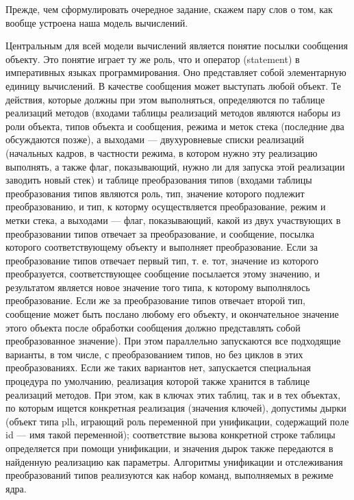 \documentclass{report}
\begin{document}
    Прежде, чем сформулировать очередное задание, скажем пару слов о том, как вообще устроена наша модель вычислений.

    Центральным для всей модели вычислений является понятие посылки сообщения объекту. Это понятие играет ту же роль, что и оператор (statement) в императивных языках программирования. Оно представляет собой элементарную единицу вычислений. В качестве сообщения может выступать любой объект. Те действия, которые должны при этом выполняться, определяются по таблице реализаций методов (входами таблицы реализаций методов являются наборы из роли объекта, типов объекта и сообщения, режима и меток стека (последние два обсуждаются позже), а выходами --- двухуровневые списки реализаций (начальных кадров, в частности режима, в котором нужно эту реализацию выполнять, а также флаг, показывающий, нужно ли для запуска этой реализации заводить новый стек) и таблице преобразования типов (входами таблицы преобразования типов являются роль, тип, значение которого подлежит преобразованию, и тип, к которму осуществляется преобразование, режим и метки стека, а выходами --- флаг, показывающий, какой из двух участвующих в преобразовании типов отвечает за преобразование, и сообщение, посылка которого соответствующему объекту и выполняет преобразование. Если за преобразование типов отвечает первый тип, т. е. тот, значение из которого преобразуется, соответствующее сообщение посылается этому значению, и результатом является новое значение того типа, к которому выполнялось преобразование. Если же за преобразование типов отвечает второй тип, сообщение может быть послано любому его объекту, и окончательное значение этого объекта после обработки сообщения должно представлять собой преобразованное значение). При этом параллельно запускаются все подходящие варианты, в том числе, с преобразованием типов, но без циклов в этих преобразованиях. Если же таких вариантов нет, запускается специальная процедура по умолчанию, реализация которой также хранится в таблице реализаций методов. При этом, как в ключах этих таблиц, так и в тех объектах, по которым ищется конкретная реализация (значения ключей), допустимы дырки (объект типа plh, играющий роль переменной при унификации, содержащий поле id --- имя такой переменной); соответствие вызова конкретной строке таблицы определяется при помощи унификации, и значения дырок также передаются в найденную реализацию как параметры. Алгоритмы унификации и отслеживания преобразований типов реализуются как набор команд, выполняемых в режиме ядра.
\end{document}
